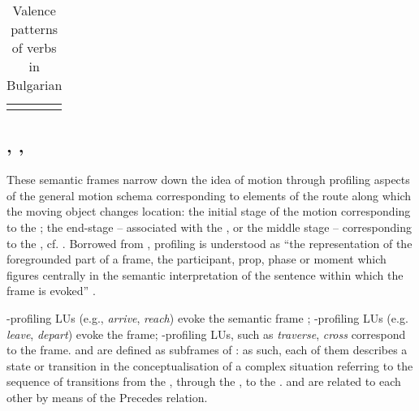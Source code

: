 \documentclass[output=paper,colorlinks,citecolor=brown]{langscibook}
\begin{document}
\begin{table}
\begin{tabularx}{\textwidth}{lrQ}
\lspbottomrule
\end{tabularx}
    \caption{Valence patterns of  verbs in Bulgarian}
    \label{tab:4:selfmotion-valence-bg}
\end{table}


\subsection{, , }\label{traversing}

These semantic frames narrow down the idea of motion through profiling aspects of the general motion schema corresponding to elements of the route along which the moving object changes location: the initial stage of the motion corresponding to the ; the end-stage -- associated with the , or the middle stage -- corresponding to the , cf. \citep[16]{Johnson2001}. Borrowed from \citet{Langacker1987}, profiling is understood as ``the representation of the foregrounded part of a frame, the participant, prop, phase or moment which figures centrally in the semantic interpretation of the sentence within which the frame is evoked” \citep[16]{Fillmore2001}. 

-profiling LUs (e.g., \textit{arrive}, \textit{reach}) evoke the semantic frame ;  \hyp profiling LUs (e.g. \textit{leave}, \textit{depart}) evoke the  frame; \hyp profiling LUs, such as \textit{traverse}, \textit{cross} correspond to the  frame.  and  are defined as subframes of : as such, each of them describes a state or transition in the conceptualisation of a complex situation referring to the sequence of transitions from the , through the , to the .  and  are related to each other by means of the Precedes relation. %
\end{document}
